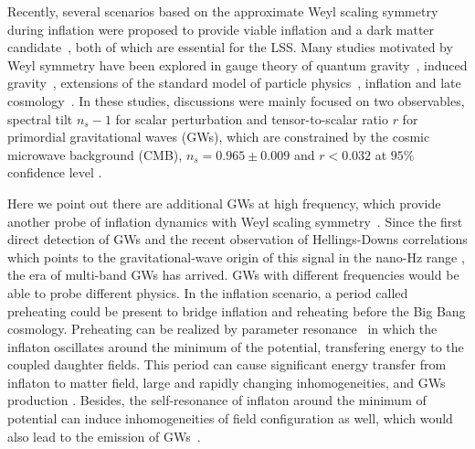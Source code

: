 \documentclass[12pt, a4paper]{article}
\begin{document}
Recently, several scenarios based on the approximate Weyl scaling symmetry during inflation were proposed to provide viable inflation and a dark matter candidate~\cite{Tang:2018mhn, Tang:2019olx, Tang:2019uex, Tang:2020ovf, Tang:2021lcn, Wang:2022ojc, Wang:2023hsb}, both of which are essential for the LSS. Many studies motivated by Weyl symmetry have been explored in gauge theory of quantum gravity~\cite{Wu:2015wwa, Wu:2017urh}, induced gravity~\cite{Zee:1978wi, Adler:1982ri, Fujii:1982ms, Salvio:2014soa, Oda:2020yyv, Karananas:2021gco}, extensions of the standard model of particle physics~\cite{Cheng:1988zx, Hur:2011sv, Holthausen:2013ota, Foot:2007iy, Nishino:2009in, Farzinnia:2013pga, Guo:2015lxa, Kubo:2018kho, Burikham:2023bil}, inflation and late cosmology~\cite{Wu:2004rs, Ferrara:2010in, GarciaBellido:2011de, Kurkov:2013gma, Bars:2013yba, Csaki:2014bua, Kannike:2015apa, Kannike:2015kda, Salvio:2017xul, Ferreira:2018qss, Ghilencea:2018thl, Ghilencea:2019rqj, Ferreira:2019zzx, Ghilencea:2018dqd, Gunji:2019wtk, Ishiwata:2018dxg, Ishida:2019wkd, Barnaveli:2018dxo, Gialamas:2019nly, Karam:2018mft, Ghilencea:2020piz, Cai:2021png, Gialamas:2022xtt}. In these studies, discussions were mainly focused on two observables, spectral tilt $n_s-1$ for scalar perturbation and tensor-to-scalar ratio $r$ for primordial gravitational waves (GWs), which are constrained by the cosmic microwave background (CMB), $n_s=0.965\pm 0.009$ and $r<0.032$ at $95\%$ confidence level \cite{Planck:2018jri,Tristram:2021tvh}. 

Here we point out there are additional GWs at high frequency, which provide another probe of inflation dynamics with Weyl scaling symmetry~\cite{Wang:2022ojc, Wang:2023hsb}. Since the first direct detection of GWs \cite{LIGOScientific:2016aoc} and the recent observation of Hellings-Downs correlations which points to the gravitational-wave origin of this signal in the nano-Hz range \cite{NANOGrav:2023gor, NANOGrav:2023hvm, Antoniadis:2023rey, Antoniadis:2023zhi, Xu:2023wog, Reardon:2023gzh}, the era of multi-band GWs has arrived. GWs with different frequencies would be able to probe different physics. In the inflation scenario, a period called preheating could be present to bridge inflation and reheating before the Big Bang cosmology. Preheating can be realized by parameter resonance~\cite{Kofman:1994rk} in which the inflaton oscillates around the minimum of the potential, transfering energy to the coupled daughter fields. This period can cause significant energy transfer from inflaton to matter field, large and rapidly changing inhomogeneities, and GWs production \cite{Khlebnikov:1997di}. Besides, the self-resonance of inflaton around the minimum of potential can induce inhomogeneities of field configuration as well, which would also lead to the emission of GWs~\cite{Amin:2011hj,Zhou:2013tsa,Liu:2017hua}.
 
\end{document}
